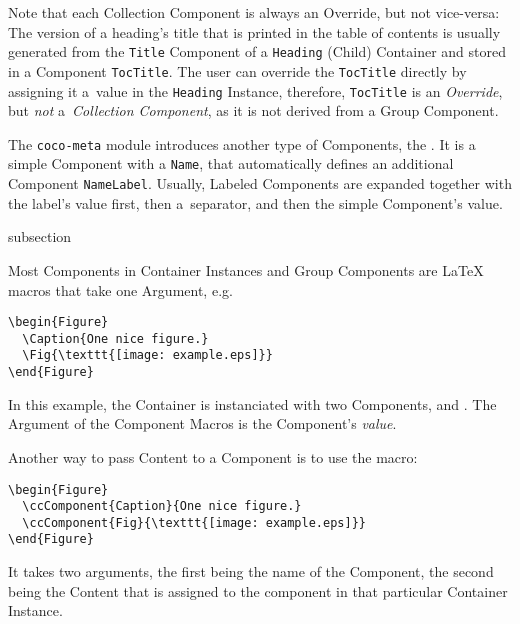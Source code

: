 Note that each Collection Component is always an Override, but not
vice-versa: The version of a heading's title that is printed in the
table of contents is usually generated from the \texttt{Title}
Component of a \texttt{Heading} (Child) Container and stored in a
Component \texttt{TocTitle}. The user can override the
\texttt{TocTitle} directly by assigning it a~value in the
\texttt{Heading} Instance, therefore, \texttt{TocTitle} is an
\textit{Override}, but \textit{not} a~\textit{Collection Component},
as it is not derived from a Group Component.

The \texttt{coco-meta} module introduces another type of Components,
the . It is a simple Component with a
\texttt{Name}, that automatically defines an additional Component
\texttt{NameLabel}. Usually, Labeled Components are expanded together
with the label's value first, then a~separator, and then the simple
Component's value.

\begin{Heading}{subsection}
\end{Heading}

Most Components in Container Instances and Group Components are
{\LaTeX} macros that take one Argument, e.g.
\begin{lstlisting}[style=tex]
\begin{Figure}
  \Caption{One nice figure.}
  \Fig{\texttt{[image: example.eps]}}
\end{Figure}
\end{lstlisting}
In this example, the Container  is
instanciated with two Components,  and
. The Argument of the Component Macros is the
Component's \textit{value}.

Another way to pass Content to a Component is to use the
\DeclareMacro{\ccComponent} macro:
\begin{lstlisting}[style=tex]
\begin{Figure}
  \ccComponent{Caption}{One nice figure.}
  \ccComponent{Fig}{\texttt{[image: example.eps]}}
\end{Figure}
\end{lstlisting}
It takes two arguments, the first being the name of the Component, the
second being the Content that is assigned to the component in that
particular Container Instance.

